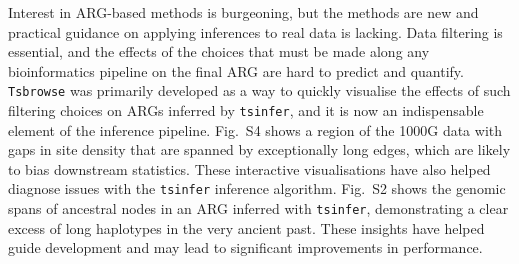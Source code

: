 \documentclass[unnumsec,webpdf,contemporary,large,namedate]{oup-authoring-template}%
\begin{document}
Interest in ARG-based methods is burgeoning, but the methods are new
and practical guidance on applying inferences to real data is lacking.
Data filtering is essential, and the effects of the
choices that must be made along any bioinformatics pipeline on the final
ARG are hard to predict and quantify. \texttt{Tsbrowse} was primarily
developed as a way to quickly visualise the effects of such filtering
choices on ARGs inferred by \texttt{tsinfer}, and it is now an indispensable
element of the inference pipeline. Fig.~S4
shows a region of the 1000G data with gaps in site density that are spanned by
 exceptionally long edges, which are likely to bias downstream statistics.
These interactive visualisations have also helped diagnose issues with
the \texttt{tsinfer} inference algorithm.
Fig.~S2 shows the genomic spans of
ancestral nodes in an ARG inferred with \texttt{tsinfer}, demonstrating a clear
excess of long haplotypes in the very ancient past. These insights
have helped guide development and
may lead to significant improvements in performance.


\end{document}
